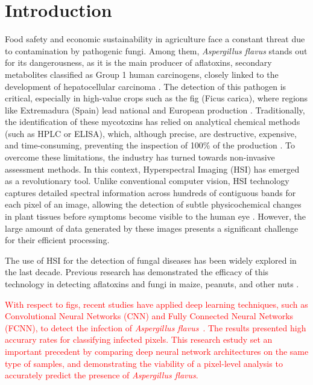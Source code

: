 \documentclass[aipa,article,submit,pdftex,moreauthors]{Definitions/mdpi}
\begin{document}
\section{Introduction}
Food safety and economic sustainability in agriculture face a constant threat due to contamination by pathogenic fungi. 
Among them, \textit{Aspergillus flavus} stands out for its dangerousness, as it is the main producer of aflatoxins, secondary metabolites classified as Group 1 human carcinogens, closely linked to the development of hepatocellular carcinoma \cite{cruz-carrasco_detection_2024}. 
The detection of this pathogen is critical, especially in high-value crops such as the fig (Ficus carica), where regions like Extremadura (Spain) lead national and European production \cite{cruz-carrasco_detection_2024}. 
Traditionally, the identification of these mycotoxins has relied on analytical chemical methods (such as HPLC or ELISA), which, although precise, are destructive, expensive, and time-consuming, preventing the inspection of 100\% of the production \cite{chu_classifying_2020}\cite{park_hyperspectral_2015}. 
To overcome these limitations, the industry has turned towards non-invasive assessment methods. 
In this context, Hyperspectral Imaging (HSI) has emerged as a revolutionary tool. 
Unlike conventional computer vision, HSI technology captures detailed spectral information across hundreds of contiguous bands for each pixel of an image, allowing the detection of subtle physicochemical changes in plant tissues before symptoms become visible to the human eye \cite{wang_review_2021}\cite{chu_classifying_2020}. 
However, the large amount of data generated by these images presents a significant challenge for their efficient processing.


The use of HSI for the detection of fungal diseases has been widely explored in the last decade. 
Previous research has demonstrated the efficacy of this technology in detecting aflatoxins and fungi in maize, peanuts, and other nuts \cite{park_hyperspectral_2015}\cite{cruz-carrasco_detection_2024}. 


\textcolor{red}{With respect to figs, recent studies have applied deep learning techniques, such as Convolutional Neural Networks (CNN) and Fully Connected Neural Networks (FCNN), to detect the infection of \textit{Aspergillus flavus}~\cite{cruz-carrasco_detection_2024}. The results presented high accurary rates for classifying infected pixels. This research estudy set an important precedent by comparing deep neural network architectures on the same type of samples, and demonstrating the viability of a pixel-level analysis to accurately predict the presence of \textit{Aspergillus flavus}.} 
\end{document}
